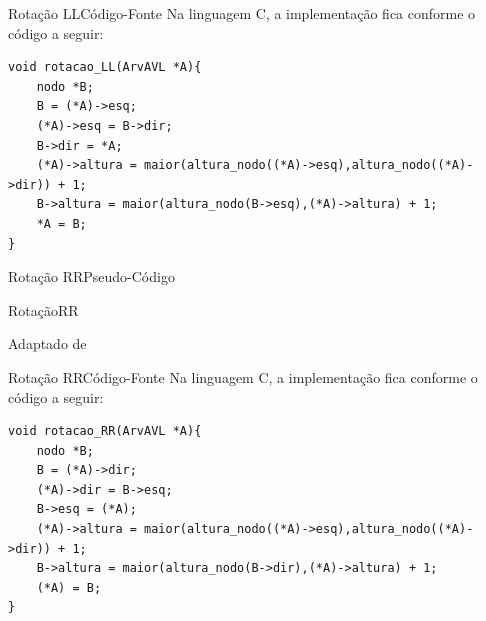 \documentclass[aspectratio=169]{beamer}
\begin{document}

\begin{frame}[fragile]{Rotação LL}{Código-Fonte}
Na linguagem C, a implementação fica conforme o código a seguir:
\begin{lstlisting}[style=CStyle]
void rotacao_LL(ArvAVL *A){
    nodo *B;
    B = (*A)->esq;
    (*A)->esq = B->dir;
    B->dir = *A;
    (*A)->altura = maior(altura_nodo((*A)->esq),altura_nodo((*A)->dir)) + 1;
    B->altura = maior(altura_nodo(B->esq),(*A)->altura) + 1;
    *A = B;
}
\end{lstlisting}  
\end{frame}


\begin{frame}{Rotação RR}{Pseudo-Código}
\begin{algorithm}[H]
\caption{RotaçãoRR} 
\label{RotacaoRR}
\end{algorithm}
\tiny{Adaptado de \cite{Backes2016}}  
\end{frame}


\begin{frame}[fragile]{Rotação RR}{Código-Fonte}
Na linguagem C, a implementação fica conforme o código a seguir:
\begin{lstlisting}[style=CStyle]
void rotacao_RR(ArvAVL *A){
    nodo *B;
    B = (*A)->dir;
    (*A)->dir = B->esq;
    B->esq = (*A);
    (*A)->altura = maior(altura_nodo((*A)->esq),altura_nodo((*A)->dir)) + 1;
    B->altura = maior(altura_nodo(B->dir),(*A)->altura) + 1;
    (*A) = B;
}
\end{lstlisting}  
\end{frame}
\end{document}
